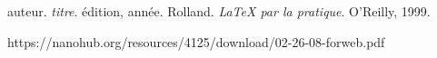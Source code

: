 \begin{thebibliography}{ABC}	
     auteur. \emph{titre}. édition, année.
     Rolland. \emph{LaTeX par la pratique}. O'Reilly, 1999.
\end{thebibliography}


https://nanohub.org/resources/4125/download/02-26-08-forweb.pdf

